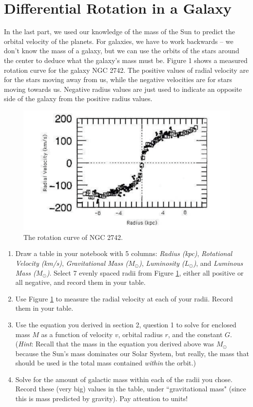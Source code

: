 \documentclass[11pt]{article}%
\begin{document}
\break
\section{Differential Rotation in a Galaxy}

\noindent
In the last part, we used our knowledge of the mass of the Sun to predict the orbital velocity of the planets. For galaxies, we have to work backwards -- we don't know the mass of a galaxy, but we can use the orbits of the stars around the center to deduce what the galaxy's mass must be. Figure 1 shows a measured rotation curve for the galaxy NGC 2742. The positive values of radial velocity are for the stars moving away from us, while the negative velocities are for stars moving towards us. Negative radius values are just used to indicate an opposite side of the galaxy from the positive radius values. 

\begin{figure}[h!]
\center
\includegraphics[scale=0.6]{Images/rotation_curve.png}
\caption{The rotation curve of NGC 2742.}
\label{rotcurve}
\end{figure}

\begin{enumerate}
\item Draw a table in your notebook with 5 columns: \textit{Radius (kpc)}, \textit{Rotational Velocity (km/s)}, \textit{Gravitational Mass ($M_{\odot}$)}, \textit{Luminosity ($L_{\odot}$)}, and \textit{Luminous Mass ($M_{\odot}$)}.
Select 7 evenly spaced radii from Figure \ref{rotcurve}, either all positive or all negative, and record them in your table.
\item Use Figure \ref{rotcurve} to measure the radial velocity at each of your radii. Record them in your table.
\item Use the equation you derived in section 2, question 1 to solve for enclosed mass $M$ as a function of velocity $v$, orbital radius $r$, and the constant $G$. (\textit{Hint}: Recall that the mass in the equation you derived above was $M_\odot$ because the Sun's mass dominates our Solar System, but really, the mass that should be used is the total mass contained \textit{within} the orbit.)
\item Solve for the amount of galactic mass within each of the radii you chose. Record these (very big) values in the table, under ``gravitational mass" (since this is mass predicted by gravity). Pay attention to units!
\end{enumerate}
\end{document}
